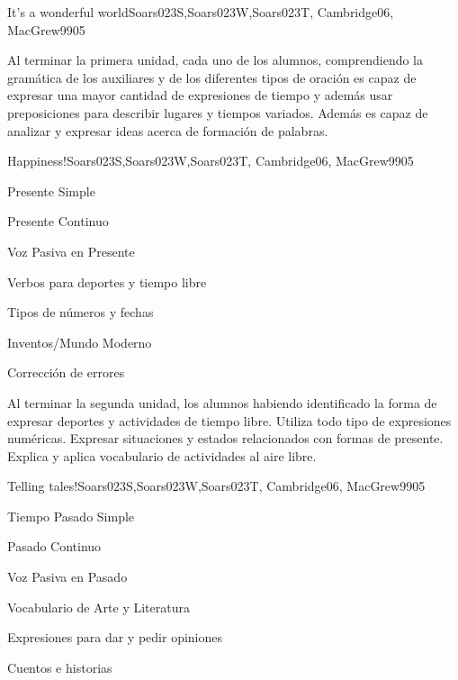 \begin{syllabus}
\begin{unit}{It's a wonderful world}{Soars023S,Soars023W,Soars023T, Cambridge06, MacGrew99}{0}{5}
   \begin{learningoutcomes}
      \item Al terminar la primera unidad, cada uno de los alumnos, comprendiendo la gramática de los auxiliares y de los diferentes tipos de oración es capaz de expresar una mayor cantidad de expresiones de tiempo y además usar preposiciones para describir lugares y tiempos variados. Además es capaz de analizar y expresar ideas acerca de formación de palabras.
   \end{learningoutcomes}
\end{unit}

\begin{unit}{Happiness!}{Soars023S,Soars023W,Soars023T, Cambridge06, MacGrew99}{0}{5}
   \begin{topics}
      \item Presente Simple
      \item Presente Continuo
      \item Voz Pasiva en Presente
      \item Verbos para deportes y tiempo libre
      \item Tipos de números y fechas
      \item Inventos/Mundo Moderno
      \item Corrección de errores
   \end{topics}

   \begin{learningoutcomes}
      \item Al terminar la segunda unidad, los alumnos habiendo identificado la forma de expresar deportes y actividades de tiempo libre. Utiliza todo tipo de expresiones numéricas. Expresar situaciones y estados relacionados con formas de presente. Explica y aplica vocabulario de actividades al aire libre. 
   \end{learningoutcomes}
\end{unit}

\begin{unit}{Telling tales!}{Soars023S,Soars023W,Soars023T, Cambridge06, MacGrew99}{0}{5}
   \begin{topics}
      \item Tiempo Pasado Simple
      \item Pasado Continuo
      \item Voz Pasiva en Pasado 
      \item Vocabulario de Arte y Literatura
      \item Expresiones para dar y pedir opiniones
      \item Cuentos e  historias
   \end{topics}


\end{unit}
\end{syllabus}
